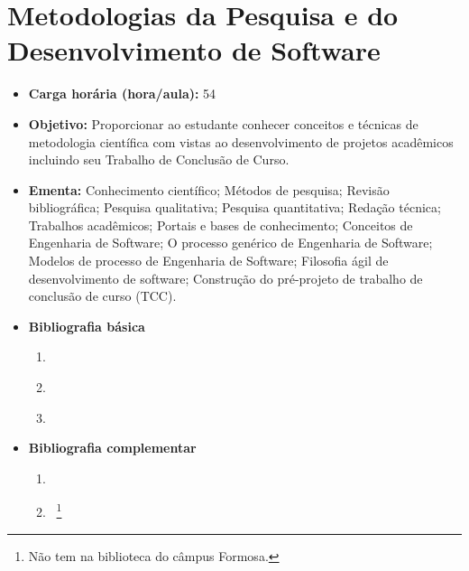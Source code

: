 \documentclass[11pt,fleqn]{book} %
\begin{document}
\section{Metodologias da Pesquisa e do Desenvolvimento de Software}\label{5_metodologia}
\begin{itemize}
	\item \textbf{Carga horária (hora/aula):} 54
	\item \textbf{Objetivo:} Proporcionar ao estudante conhecer conceitos e técnicas de metodologia científica com vistas ao desenvolvimento de projetos acadêmicos incluindo seu Trabalho de Conclusão de Curso.
	\item \textbf{Ementa:} 
	Conhecimento científico;
	Métodos de pesquisa; 
	Revisão bibliográfica;
	Pesquisa qualitativa;
	Pesquisa quantitativa; 
	Redação técnica;
	Trabalhos acadêmicos;
	Portais e bases de conhecimento;
	Conceitos de Engenharia de Software;
	O processo genérico de Engenharia de Software;
	Modelos de processo de Engenharia de Software;
	Filosofia ágil de desenvolvimento de software;
	Construção do pré-projeto de trabalho de conclusão de curso (TCC).
	\item \textbf{Bibliografia básica}
	\begin{enumerate}
		\item \cite{Andrade2005introduccao}
		\item \cite{gil2002elaborar}
		\item \cite{wazlawick2017metodologia}
	\end{enumerate}
	\item \textbf{Bibliografia complementar}
	\begin{enumerate}
		\item \cite{koche2016fundamentos}
		\item \cite{aquino2017escrever}~\footnote{Não tem na biblioteca do câmpus Formosa.}
	\end{enumerate} 	
\end{itemize}


\newpage
\end{document}
